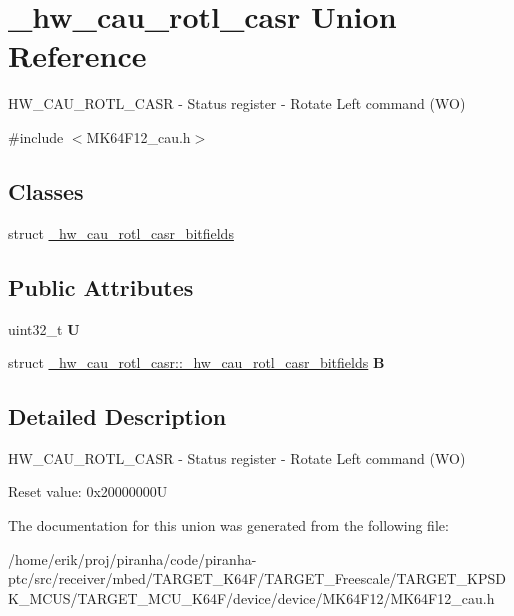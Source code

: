 \hypertarget{union__hw__cau__rotl__casr}{}\section{\+\_\+hw\+\_\+cau\+\_\+rotl\+\_\+casr Union Reference}
\label{union__hw__cau__rotl__casr}


H\+W\+\_\+\+C\+A\+U\+\_\+\+R\+O\+T\+L\+\_\+\+C\+A\+SR -\/ Status register -\/ Rotate Left command (WO)  




{\ttfamily \#include $<$M\+K64\+F12\+\_\+cau.\+h$>$}

\subsection*{Classes}
\begin{DoxyCompactItemize}
\item 
struct \hyperlink{struct__hw__cau__rotl__casr_1_1__hw__cau__rotl__casr__bitfields}{\+\_\+hw\+\_\+cau\+\_\+rotl\+\_\+casr\+\_\+bitfields}
\end{DoxyCompactItemize}
\subsection*{Public Attributes}
\begin{DoxyCompactItemize}
\item 
uint32\+\_\+t {\bfseries U}\hypertarget{union__hw__cau__rotl__casr_adeff74017b77d107340a6b55a08e5bf0}{}\label{union__hw__cau__rotl__casr_adeff74017b77d107340a6b55a08e5bf0}

\item 
struct \hyperlink{struct__hw__cau__rotl__casr_1_1__hw__cau__rotl__casr__bitfields}{\+\_\+hw\+\_\+cau\+\_\+rotl\+\_\+casr\+::\+\_\+hw\+\_\+cau\+\_\+rotl\+\_\+casr\+\_\+bitfields} {\bfseries B}\hypertarget{union__hw__cau__rotl__casr_ac73c19669a480755c4923196478a6e90}{}\label{union__hw__cau__rotl__casr_ac73c19669a480755c4923196478a6e90}

\end{DoxyCompactItemize}


\subsection{Detailed Description}
H\+W\+\_\+\+C\+A\+U\+\_\+\+R\+O\+T\+L\+\_\+\+C\+A\+SR -\/ Status register -\/ Rotate Left command (WO) 

Reset value\+: 0x20000000U 

The documentation for this union was generated from the following file\+:\begin{DoxyCompactItemize}
\item 
/home/erik/proj/piranha/code/piranha-\/ptc/src/receiver/mbed/\+T\+A\+R\+G\+E\+T\+\_\+\+K64\+F/\+T\+A\+R\+G\+E\+T\+\_\+\+Freescale/\+T\+A\+R\+G\+E\+T\+\_\+\+K\+P\+S\+D\+K\+\_\+\+M\+C\+U\+S/\+T\+A\+R\+G\+E\+T\+\_\+\+M\+C\+U\+\_\+\+K64\+F/device/device/\+M\+K64\+F12/M\+K64\+F12\+\_\+cau.\+h\end{DoxyCompactItemize}
